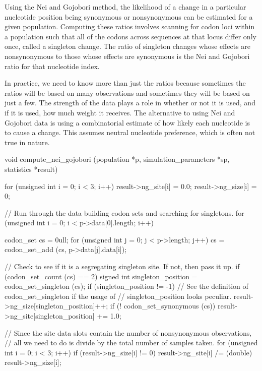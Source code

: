 \documentclass{article}
\begin{document}
      Using the Nei and Gojobori method, the likelihood of a change in a
      particular nucleotide position being synonymous or nonsynonymous can be
      estimated for a given population. Computing these ratios involves scanning
      for codon loci within a population such that all of the codons across
      sequences at that locus differ only once, called a singleton change. The
      ratio of singleton changes whose effects are nonsynonymous to those whose
      effects are synonymous is the Nei and Gojobori ratio for that nucleotide
      index.

      In practice, we need to know more than just the ratios because sometimes
      the ratios will be based on many observations and sometimes they will be
      based on just a few. The strength of the data plays a role in whether or
      not it is used, and if it is used, how much weight it receives. The
      alternative to using Nei and Gojobori data is using a combinatorial
      estimate of how likely each nucleotide is to cause a change. This assumes
      neutral nucleotide preference, which is often not true in nature.

\begin{ccode}
void compute_nei_gojobori (population *p, simulation_parameters *sp, statistics *result) {
  for (unsigned int i = 0; i < 3; i++) {
    result->ng_site[i] = 0.0;
    result->ng_size[i] = 0;
  }

  // Run through the data building codon sets and searching for singletons.
  for (unsigned int i = 0; i < p->data[0].length; i++) {
    codon_set cs = 0ull;
    for (unsigned int j = 0; j < p->length; j++)
      cs = codon_set_add (cs, p->data[j].data[i]);

    // Check to see if it is a segregating singleton site. If not, then pass it up.
    if (codon_set_count (cs) == 2) {
      signed int singleton_position = codon_set_singleton (cs);
      if (singleton_position != -1) {
        // See the definition of codon_set_singleton if the usage of
        // singleton_position looks peculiar.
        result->ng_size[singleton_position]++;
        if (! codon_set_synonymous (cs))
         result->ng_site[singleton_position] += 1.0;
      }
    }
  }

  // Since the site data slots contain the number of nonsynonymous observations,
  // all we need to do is divide by the total number of samples taken.
  for (unsigned int i = 0; i < 3; i++)
    if (result->ng_size[i] != 0)
      result->ng_site[i] /= (double) result->ng_size[i];
}
\end{ccode}
\end{document}
